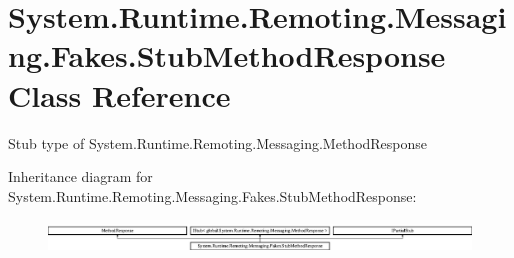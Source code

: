 \hypertarget{class_system_1_1_runtime_1_1_remoting_1_1_messaging_1_1_fakes_1_1_stub_method_response}{\section{System.\-Runtime.\-Remoting.\-Messaging.\-Fakes.\-Stub\-Method\-Response Class Reference}
\label{class_system_1_1_runtime_1_1_remoting_1_1_messaging_1_1_fakes_1_1_stub_method_response}
}


Stub type of System.\-Runtime.\-Remoting.\-Messaging.\-Method\-Response 


Inheritance diagram for System.\-Runtime.\-Remoting.\-Messaging.\-Fakes.\-Stub\-Method\-Response\-:\begin{figure}[H]
\begin{center}
\leavevmode
\includegraphics[height=0.891010cm]{class_system_1_1_runtime_1_1_remoting_1_1_messaging_1_1_fakes_1_1_stub_method_response}
\end{center}
\end{figure}

